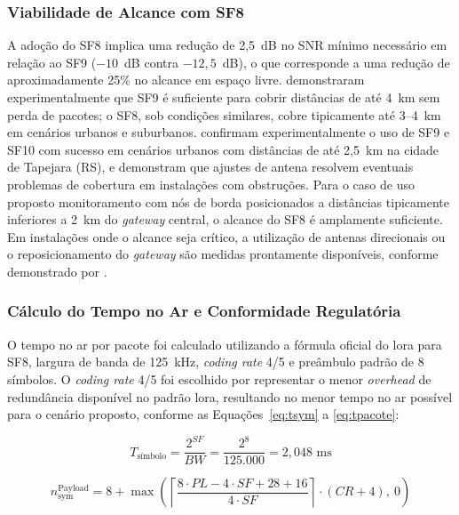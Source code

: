 \subsubsection{Viabilidade de Alcance com SF8}
 
A adoção do SF8 implica uma redução de 2,5~dB no SNR mínimo necessário em relação
ao SF9 ($-10$~dB contra $-12,5$~dB), o que corresponde a uma redução de
aproximadamente 25\% no alcance em espaço livre.  demonstraram
experimentalmente que SF9 é suficiente para cobrir distâncias de até 4~km sem perda de
pacotes; o SF8, sob condições similares, cobre tipicamente até 3--4~km em cenários
urbanos e suburbanos.  confirmam experimentalmente o uso de
SF9 e SF10 com sucesso em cenários urbanos com distâncias de até 2,5~km na cidade
de Tapejara (RS), e demonstram que ajustes de antena resolvem eventuais problemas
de cobertura em instalações com obstruções. Para o caso de uso proposto
monitoramento com nós de borda posicionados a distâncias tipicamente inferiores a 2~km
do \textit{gateway} central, o alcance do SF8 é amplamente suficiente. Em
instalações onde o alcance seja crítico, a utilização de antenas direcionais ou o
reposicionamento do \textit{gateway} são medidas prontamente disponíveis, conforme
demonstrado por .
 
\subsubsection{Cálculo do Tempo no Ar e Conformidade Regulatória}
 
O tempo no ar por pacote foi calculado utilizando a fórmula oficial do \gls{lora} para SF8,
largura de banda de 125~kHz, \textit{coding rate} 4/5 e preâmbulo padrão de 8 símbolos.
O \textit{coding rate} 4/5 foi escolhido por representar o menor \textit{overhead} de redundância
disponível no padrão \gls{lora}, resultando no menor tempo no ar possível para o cenário
proposto, conforme as Equações~\ref{eq:tsym} a \ref{eq:tpacote}:
 
\begin{equation}
  \label{eq:tsym}
  T_{\text{símbolo}} = \frac{2^{SF}}{BW} = \frac{2^8}{125{.}000} = 2{,}048 \text{ ms}
\end{equation}
 
\begin{equation}
  \label{eq:nsym}
  n_{\text{sym}}^{\text{Payload}} = 8 + \max\!\left(\left\lceil \frac{8 \cdot PL - 4 \cdot SF + 28 + 16}{4 \cdot SF} \right\rceil \cdot (CR + 4),\ 0\right)
\end{equation}
 
